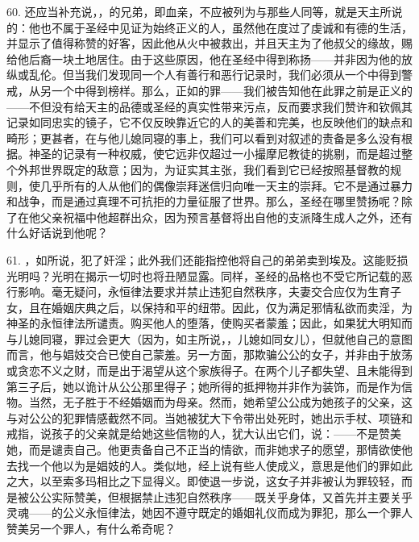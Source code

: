 60. 还应当补充说，，的兄弟，即血亲，不应被列为与那些人同等，就是天主所说的：他也不属于圣经中见证为始终正义的人，虽然他在度过了虔诚和有德的生活，并显示了值得称赞的好客，因此他从火中被救出，并且天主为了他叔父的缘故，赐给他后裔一块土地居住。由于这些原因，他在圣经中得到称扬——并非因为他的放纵或乱伦。但当我们发现同一个人有善行和恶行记录时，我们必须从一个中得到警戒，从另一个中得到榜样。那么，正如的罪——我们被告知他在此罪之前是正义的——不但没有给天主的品德或圣经的真实性带来污点，反而要求我们赞许和钦佩其记录如同忠实的镜子，它不仅反映靠近它的人的美善和完美，也反映他们的缺点和畸形；更甚者，在与他儿媳同寝的事上，我们可以看到对叙述的责备是多么没有根据。神圣的记录有一种权威，使它远非仅超过一小撮摩尼教徒的挑剔，而是超过整个外邦世界既定的敌意；因为，为证实其主张，我们看到它已经按照基督教的规则，使几乎所有的人从他们的偶像崇拜迷信归向唯一天主的崇拜。它不是通过暴力和战争，而是通过真理不可抗拒的力量征服了世界。那么，圣经在哪里赞扬呢？除了在他父亲祝福中他超群出众，因为预言基督将出自他的支派降生成人之外，还有什么好话说到他呢？\par

61. ，如所说，犯了奸淫；此外我们还能指控他将自己的弟弟卖到埃及。这能贬损光明吗？光明在揭示一切时也将丑陋显露。同样，圣经的品格也不受它所记载的恶行影响。毫无疑问，永恒律法要求并禁止违犯自然秩序，夫妻交合应仅为生育子女，且在婚姻庆典之后，以保持和平的纽带。因此，仅为满足邪情私欲而卖淫，为神圣的永恒律法所谴责。购买他人的堕落，使购买者蒙羞；因此，如果犹大明知而与儿媳同寝，罪过会更大（因为，如主所说，，儿媳如同女儿），但就他自己的意图而言，他与娼妓交合已使自己蒙羞。另一方面，那欺骗公公的女子，并非由于放荡或贪恋不义之财，而是出于渴望从这个家族得子。在两个儿子都失望、且未能得到第三子后，她以诡计从公公那里得子；她所得的抵押物并非作为装饰，而是作为信物。当然，无子胜于不经婚姻而为母亲。然而，她希望公公成为她孩子的父亲，这与对公公的犯罪情感截然不同。当她被犹大下令带出处死时，她出示手杖、项链和戒指，说孩子的父亲就是给她这些信物的人，犹大认出它们，说：——不是赞美她，而是谴责自己。他更责备自己不正当的情欲，而非她求子的愿望，那情欲使他去找一个他以为是娼妓的人。类似地，经上说有些人使成义，意思是他们的罪如此之大，以至索多玛相比之下显得义。即使退一步说，这女子并非被认为罪较轻，而是被公公实际赞美，但根据禁止违犯自然秩序——既关乎身体，又首先并主要关乎灵魂——的公义永恒律法，她因不遵守既定的婚姻礼仪而成为罪犯，那么一个罪人赞美另一个罪人，有什么希奇呢？\par

